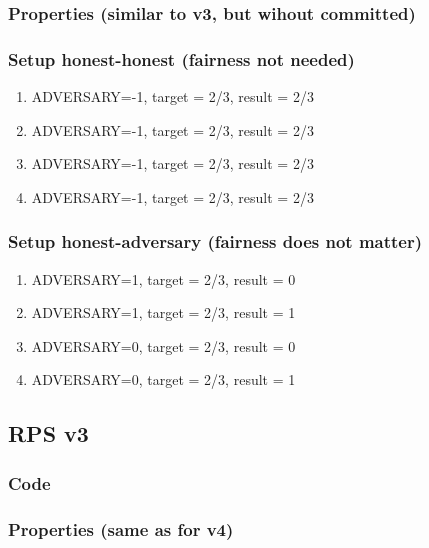 \documentclass{article}
\begin{document}


\subsubsection{Properties (similar to v3, but wihout committed)}



\subsubsection{Setup honest-honest (fairness not needed)}

\begin{enumerate}
\item ADVERSARY=-1, target = 2/3, result = 2/3
\item ADVERSARY=-1, target = 2/3, result = 2/3
\item ADVERSARY=-1, target = 2/3, result = 2/3
\item ADVERSARY=-1, target = 2/3, result = 2/3
\end{enumerate}

\subsubsection{Setup honest-adversary (fairness does not matter)}

\begin{enumerate}
\item ADVERSARY=1, target = 2/3, result = 0
\item ADVERSARY=1, target = 2/3, result = 1
\item ADVERSARY=0, target = 2/3, result = 0
\item ADVERSARY=0, target = 2/3, result = 1
\end{enumerate}

\subsection{RPS v3}

\subsubsection{Code}



\subsubsection{Properties (same as for v4)}
\end{document}
